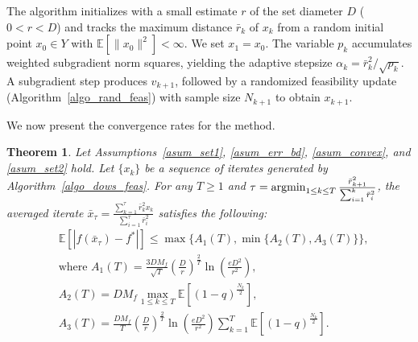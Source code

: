 \documentclass{article}
\newcommand{\EXP}[1]
{\mathbb{E}\!\left[#1\right] }
\def\argmin{\mathop{\rm argmin}}
\theoremstyle{plain}
\newtheorem{theorem}{Theorem}[section]
\theoremstyle{definition}
\theoremstyle{remark}
\begin{document}
The algorithm initializes with a small estimate $r$ of the set diameter $D$ ($0<r<D$) and tracks the maximum distance $\bar r_k$ of $x_k$ from a random initial point $x_0\in Y$ with $\mathbb{E}[\|x_0\|^2]<\infty$. We set $x_1=x_0$. The variable $p_k$ accumulates weighted subgradient norm squares, yielding the adaptive stepsize $\alpha_k=\bar r_k^2/\sqrt{p_k}$. A subgradient step produces $v_{k+1}$, followed by a randomized feasibility update (Algorithm~\ref{algo_rand_feas}) with sample size $N_{k+1}$ to obtain $x_{k+1}$.


We now present the convergence rates for the method.


\begin{theorem}\label{thm_adaptive_step}
    Let Assumptions~\ref{asum_set1}, \ref{asum_err_bd}, \ref{asum_convex}, and \ref{asum_set2}
    hold. Let $\{x_k\}$ be a sequence of iterates generated by Algorithm~\ref{algo_dows_feas}. For any $T \geq 1$ and $\tau = \argmin_{1 \leq k \leq T} \frac{\bar r_{k+1}^2}{\sum_{i=1}^k \bar r_i^2}$, the averaged iterate $\bar x_\tau = \frac{\sum_{k=1}^\tau \bar r_k^2 x_k} {\sum_{i=1}^\tau \bar r_i^2}$ satisfies the following:
    \begin{align*}
        &\EXP{|f(\bar x_\tau) - f^*|} \leq \max \{ A_1(T), \min \{A_2(T),A_3(T)\}\} ,\\
        &\text{where } A_1(T) = \frac{3 D M_f}{\sqrt{T}} \left(\frac{D}{r}\right)^{\frac{2}{T}} \ln \left( \frac{e D^2}{r^2} \right) , \\
        &A_2(T) = D M_f  \max_{1 \leq k \leq T} \EXP{(1-q)^{\frac{N_{k}}{2}}}, \\
        &A_3(T) = \frac{D M_f}{T} \left( \frac{D}{r} \right)^{\frac{2}{T}} \ln \left( \frac{e D^2}{r^2} \right) \sum_{k=1}^T \EXP{(1-q)^{\frac{N_{k}}{2}}} .
    \end{align*}
\end{theorem} 
%
%
\end{document}
